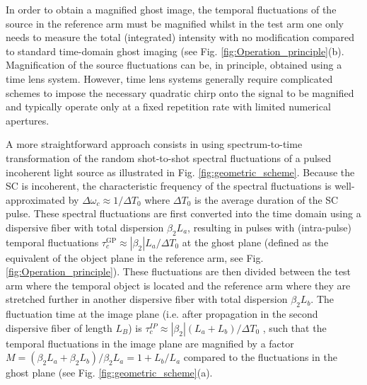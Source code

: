 \documentclass[aip,graphicx]{revtex4-1}
\begin{document}
In order to obtain a magnified ghost image, the temporal fluctuations of the source in the reference arm must be magnified\cite{Shirai10} whilst in the test arm one only needs to measure the total (integrated) intensity with no modification compared to standard time-domain ghost imaging (see Fig. \ref{fig:Operation_principle}(b). Magnification of the source fluctuations can be, in principle, obtained using a time lens system\cite{Salem08,Foster08,Schroder10}. However, time lens systems generally require complicated schemes to impose the necessary quadratic chirp onto the signal to be magnified and typically operate only at a fixed repetition rate with limited numerical apertures.

A more straightforward approach consists in using spectrum-to-time transformation of the random shot-to-shot spectral fluctuations of a pulsed incoherent light source as illustrated in Fig. \ref{fig:geometric_scheme}. Because the SC is incoherent, the characteristic frequency of the spectral fluctuations is well-approximated by $\Delta\omega_c \approx 1 / \Delta T_0 $ where $\Delta T_0$ is the average duration of the SC pulse. These spectral fluctuations are first converted into the time domain using a dispersive fiber with total dispersion $\beta_2L_a$, resulting in pulses with (intra-pulse) temporal fluctuations $\tau_c^{\text{GP}}\approx |\beta_2|L_a / \Delta T_0$ at the ghost plane (defined as the equivalent of the object plane in the reference arm, see Fig. \ref{fig:Operation_principle}). These fluctuations are then divided between the test arm where the temporal object is located and the reference arm where they are stretched further in another dispersive fiber with total dispersion $\beta_2L_b$. The fluctuation time at the image plane (i.e. after propagation in the second dispersive fiber of length $L_B$) is $\tau_c^{IP} \approx |\beta_2|(L_a+L_b) / \Delta T_0$ , such that the temporal fluctuations in the image plane are magnified by a factor $M = (\beta_2L_a +\beta_2L_b)/\beta_2L_a = 1+L_b/L_a$ compared to the fluctuations in the ghost plane (see Fig. \ref{fig:geometric_scheme}(a). 
\end{document}
